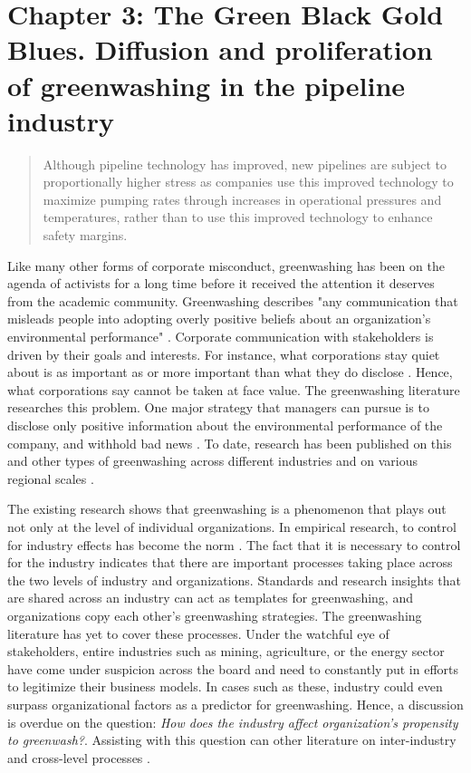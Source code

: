 \section{Chapter 3: The Green Black Gold Blues. Diffusion and proliferation of greenwashing in the pipeline industry}


\begin{quote}
	Although pipeline technology has improved, new pipelines are subject to proportionally higher stress as companies use this improved technology to maximize pumping rates through increases in operational pressures and temperatures, rather than to use this improved technology to enhance safety margins. \citep[p. 4]{Stansbury2011}
\end{quote}

Like many other forms of corporate misconduct, greenwashing has been on the agenda of activists for a long time before it received the attention it deserves from the academic community\citep[e.g.,][]{Bruno1992}. Greenwashing describes "any communication that misleads people into adopting overly positive beliefs about an organization's environmental performance" \citep[p. 225]{Lyon2015}. Corporate communication with stakeholders is driven by their goals and interests. For instance, what corporations stay quiet about is as important as or more important than what they do disclose \citep{Kim2015}. Hence, what corporations say cannot be taken at face value. The greenwashing literature researches this problem. One major strategy that managers can pursue is to disclose only positive information about the environmental performance of the company, and withhold bad news \citep{Lyon2011}. To date, research has been published on this and other types of greenwashing across different industries and on various regional scales \citep{Marquis2016, Ramus2005, Seele2017, Kassinis2018}.

The existing research shows that greenwashing is a phenomenon that plays out not only at the level of individual organizations. In empirical research, to control for industry effects has become the norm \citep[e.g.,][]{Ramus2005, Marquis2016, Du2015, Testa2018}. The fact that it is necessary to control for the industry indicates that there are important processes taking place across the two levels of industry and organizations. Standards and research insights that are shared across an industry can act as templates for greenwashing, and organizations copy each other's greenwashing strategies. The greenwashing literature has yet to cover these processes. Under the watchful eye of stakeholders, entire industries such as mining, agriculture, or the energy sector have come under suspicion across the board and need to constantly put in efforts to legitimize their business models. In cases such as these, industry could even surpass organizational factors as a predictor for greenwashing. Hence, a discussion is overdue on the question: \textit{How does the industry affect organization's propensity to greenwash?}. Assisting with this question can other literature on inter-industry and cross-level processes \citep[such as][]{Maguire2009, Hardy2020}.

